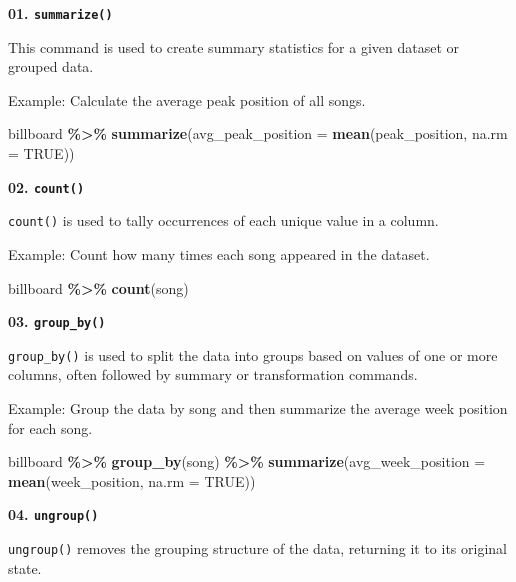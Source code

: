 \documentclass[
]{book}
\newenvironment{Shaded}{\begin{snugshade}}{\end{snugshade}}
\newcommand{\AttributeTok}[1]{\textcolor[rgb]{0.13,0.29,0.53}{#1}}
\newcommand{\ConstantTok}[1]{\textcolor[rgb]{0.56,0.35,0.01}{#1}}
\newcommand{\FunctionTok}[1]{\textcolor[rgb]{0.13,0.29,0.53}{\textbf{#1}}}
\newcommand{\NormalTok}[1]{#1}
\newcommand{\SpecialCharTok}[1]{\textcolor[rgb]{0.81,0.36,0.00}{\textbf{#1}}}
\begin{document}
\textbf{01. \texttt{summarize()}}

This command is used to create summary statistics for a given dataset or grouped data.

Example: Calculate the average peak position of all songs.

\begin{Shaded}
\begin{Highlighting}[]
\NormalTok{billboard }\SpecialCharTok{\%\textgreater{}\%}
  \FunctionTok{summarize}\NormalTok{(}\AttributeTok{avg\_peak\_position =} \FunctionTok{mean}\NormalTok{(peak\_position, }\AttributeTok{na.rm =} \ConstantTok{TRUE}\NormalTok{))}
\end{Highlighting}
\end{Shaded}

\textbf{02. \texttt{count()}}

\texttt{count()} is used to tally occurrences of each unique value in a column.

Example: Count how many times each song appeared in the dataset.

\begin{Shaded}
\begin{Highlighting}[]
\NormalTok{billboard }\SpecialCharTok{\%\textgreater{}\%}
  \FunctionTok{count}\NormalTok{(song)}
\end{Highlighting}
\end{Shaded}

\textbf{03. \texttt{group\_by()}}

\texttt{group\_by()} is used to split the data into groups based on values of one or more columns, often followed by summary or transformation commands.

Example: Group the data by song and then summarize the average week position for each song.

\begin{Shaded}
\begin{Highlighting}[]
\NormalTok{billboard }\SpecialCharTok{\%\textgreater{}\%}
  \FunctionTok{group\_by}\NormalTok{(song) }\SpecialCharTok{\%\textgreater{}\%}
  \FunctionTok{summarize}\NormalTok{(}\AttributeTok{avg\_week\_position =} \FunctionTok{mean}\NormalTok{(week\_position, }\AttributeTok{na.rm =} \ConstantTok{TRUE}\NormalTok{))}
\end{Highlighting}
\end{Shaded}

\textbf{04. \texttt{ungroup()}}

\texttt{ungroup()} removes the grouping structure of the data, returning it to its original state.
\end{document}
